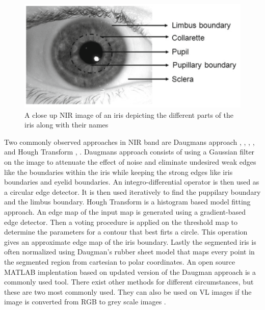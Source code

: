 \begin{figure}[htb]
\centering
\includegraphics[width=\textwidth]{figures/iris_naming.png} 
\caption{A close up NIR image of an iris depicting the different parts of the iris along with their names \citep{Bowyer2016b}}
\label{fig:iris_naming}
\end{figure}

Two commonly observed approaches in NIR band are Daugmans approach \citep{Daugman1993} , \citep{Saha2017}, \citep{Rattani2017}, \citep{Khan2017}, and Hough Transform \citep{Luhadiya2017}, \citep{Uka2017}. Daugmans approach consists of using a Gaussian filter on the image to attenuate the effect of noise and eliminate undesired weak edges like the boundaries within the iris while keeping the strong edges like iris boundaries and eyelid boundaries. An integro-differential operator is then used as a circular edge detector. It is then used iteratively to find the puppilary boundary and the limbus boundary. Hough Transform  is a histogram based model fitting approach. An edge map of the input map is generated using a gradient-based edge detector. Then a voting procedure is applied on the threshold map to determine the parameters for a contour that best firts a circle. This  operation gives an approximate edge map of the iris boundary. Lastly the segmented iris is often normalized  using  Daugman's rubber sheet model that maps every point in the segmented region from cartesian to polar coordinates. An open source MATLAB implentation based on updated version of the Daugman approach is a commonly used tool. There exist other methods for different circumstances, but these are two most commonly used. They can also be used on VL images if the image is converted from RGB to grey scale images \cite{Bowyer2016b} . 

